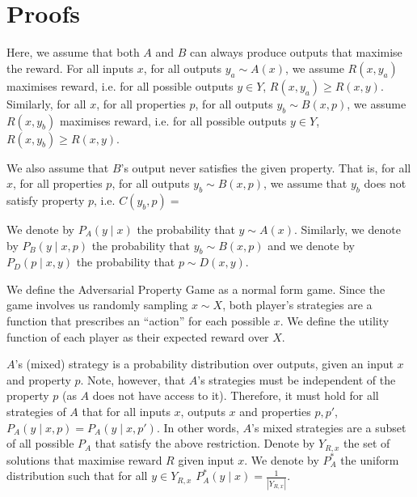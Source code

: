 \section{Proofs}
Here, we assume that both $A$ and $B$ can always produce outputs that maximise the reward. For all inputs $x$, for all outputs $y_a \sim A(x)$, we assume $R(x, y_a)$ maximises reward, i.e. for all possible outputs $y \in Y$, $R(x, y_a) \ge R(x, y)$. Similarly, for all $x$, for all properties $p$, for all outputs $y_b \sim B(x, p)$, we assume $R(x, y_b)$ maximises reward, i.e. for all possible outputs $y \in Y$, $R(x, y_b) \ge R(x, y)$.

We also assume that $B$'s output never satisfies the given property. That is, for all $x$, for all properties $p$, for all outputs $y_b \sim B(x, p)$, we assume that $y_b$ does not satisfy property $p$, i.e. $C(y_b, p) = $
 
We denote by $P_A(y\mid x)$ the probability that $y \sim A(x)$. Similarly, we denote by $P_B(y\mid x, p)$ the probability that $y_b \sim B(x, p)$ and we denote by $P_D(p \mid x, y)$ the probability that $p \sim D(x, y)$.

We define the Adversarial Property Game as a normal form game.
Since the game involves us randomly sampling $x \sim X$, both player's strategies are a function that prescribes an ``action'' for each possible $x$. We define the utility function of each player as their expected reward over $X$. %

$A$'s (mixed) strategy is a probability distribution over outputs, given an input $x$ and property $p$. Note, however, that $A$'s strategies must be independent of the property $p$ (as $A$ does not have access to it). Therefore, it must hold for all strategies of $A$ that for all inputs $x$, outputs $x$ and properties $p, p'$, $P_A(y \mid x, p) = P_A(y \mid x, p')$. %
In other words, $A$'s mixed strategies are a subset of all possible $P_A$ that satisfy the above restriction.
Denote by $Y_{R, x}$ the set of solutions that maximise reward $R$ given input $x$. %
We denote by $P^*_A$ the uniform distribution such that for all $y \in Y_{R, x}$ $P^*_A(y \mid x) = \frac{1}{|Y_{R, x}|}$.


